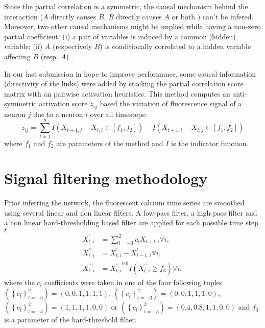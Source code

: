 \documentclass[wcp]{jmlr}
\begin{document}
Since the partial correlation is a symmetric, the causal mechanism behind the
interaction ($A$ directly causes $B$, $B$ directly causes $A$ or both ) can't
be infered. Moreover, two other causal mechanisms might be implied while having
a non-zero partial coefficient: (i) a pair of variables is induced by a
common (hidden) variable; (ii) $A$ (respectively $B$) is conditionally
correlated to a hidden variable affecting $B$ (resp. $A$)
\cite{de2004discovery}.

In our last submission in hope to improve performance, some causal information
(directivity of the links) were added by stacking the partial correlation score
matrix with an pairwise activation heuristics. This method computes an anti-symmetric
activation score $z_{ij}$ based the variation of fluorescence signal of a neuron
$j$ due to a neuron $i$ over all timesteps:
\[
z_{ij} = \sum_{t=1}^n I(X_{t+1,j} - X_{t, i} \in [f_1, f_2]) -  I(X_{t+1,i} - X_{t, j} \in [f_1, f_2])
\]
where $f_1$ and $f_2$ are parameters of the method and $I$ is the
indicator function.

\section{Signal filtering methodology}


Prior inferring the network, the fluorescent calcium time series are smoothed
using several linear and non linear filters. A low-pass filter, a high-pass
filter and a non linear hard-thresholding based filter are
applied for each possible time step $t$
\begin{align}
X^\prime_{t,i} &= \sum_{l=-3}^2 c_l X_{t+l,i} \forall i, \\
X^{\prime\prime}_{t,i} &= X^{\prime}_{t,i} - X^{\prime}_{t-1,i} \forall i, \\
X^{\prime\prime\prime}_{t,i} &= {X^{\prime\prime}_{t,i}}^{0.9} I(X^{\prime\prime}_{t,i} \geq f_3) \forall i,
\end{align}
where the $c_l$ coefficients were taken in one of the four following tuples
$(\left\{c_l\right\}_{l=-3}^2)=(0, 0, 1, 1, 1, 1)$,
$(\left\{c_l\right\}_{l=-3}^2)=(0, 0, 1, 1, 1, 0)$,
$(\left\{c_l\right\}_{l=-3}^2)=(1, 1, 1, 1, 0, 0)$ or
$(\left\{c_l\right\}_{l=-3}^2)=(0.4, 0.8, 1, 1, 0, 0)$ and $f_3$ is a parameter
of the hard-threshold filter.
\end{document}
